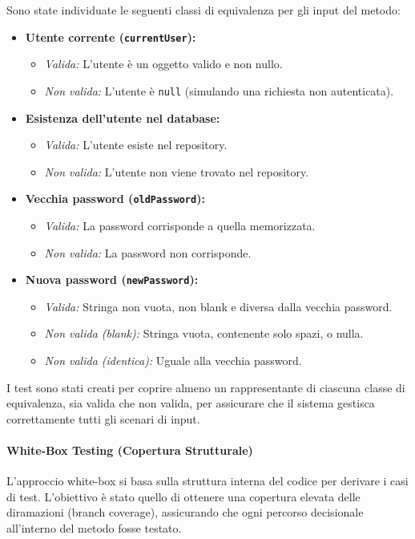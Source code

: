 Sono state individuate le seguenti classi di equivalenza per gli input del metodo:
\begin{itemize}
    \item \textbf{Utente corrente (\texttt{currentUser}):}
    \begin{itemize}
        \item \textit{Valida:} L'utente è un oggetto valido e non nullo.
        \item \textit{Non valida:} L'utente è \texttt{null} (simulando una richiesta non autenticata).
    \end{itemize}
    \item \textbf{Esistenza dell'utente nel database:}
    \begin{itemize}
        \item \textit{Valida:} L'utente esiste nel repository.
        \item \textit{Non valida:} L'utente non viene trovato nel repository.
    \end{itemize}
    \item \textbf{Vecchia password (\texttt{oldPassword}):}
    \begin{itemize}
        \item \textit{Valida:} La password corrisponde a quella memorizzata.
        \item \textit{Non valida:} La password non corrisponde.
    \end{itemize}
    \item \textbf{Nuova password (\texttt{newPassword}):}
    \begin{itemize}
        \item \textit{Valida:} Stringa non vuota, non blank e diversa dalla vecchia password.
        \item \textit{Non valida (blank):} Stringa vuota, contenente solo spazi, o nulla.
        \item \textit{Non valida (identica):} Uguale alla vecchia password.
    \end{itemize}
\end{itemize}

I test sono stati creati per coprire almeno un rappresentante di ciascuna classe di equivalenza, sia valida che non valida, per assicurare che il sistema gestisca correttamente tutti gli scenari di input.

\paragraph{White-Box Testing (Copertura Strutturale)}
L'approccio white-box si basa sulla struttura interna del codice per derivare i casi di test. L'obiettivo è stato quello di ottenere una copertura elevata delle diramazioni (branch coverage), assicurando che ogni percorso decisionale all'interno del metodo fosse testato.

